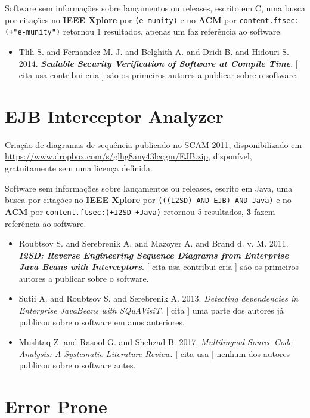 Software sem informações sobre lançamentos ou releases,
escrito em C,
uma busca por citações no {\bf IEEE Xplore} por
\texttt{(e-munity)}
e no {\bf ACM} por
\texttt{content.ftsec:(+"e-munity")}
retornou
1 resultados,
apenas um faz referência ao software.

\begin{itemize}
\item Tlili S. and Fernandez M. J. and Belghith A. and Dridi B. and Hidouri S.
      2014.
        \textbf{\textit{ Scalable Security Verification of Software at Compile Time}}.
      [
          cita
          usa
          contribui
          cria
      ]
são os primeiros autores a publicar sobre o software.
\end{itemize}
\section{EJB Interceptor Analyzer}

Criação de diagramas de sequência
publicado no SCAM 2011,
disponibilizado em \url{https://www.dropbox.com/s/glhg8any43lccgm/EJB.zip},
disponível,
gratuitamente
sem uma licença definida.

Software sem informações sobre lançamentos ou releases,
escrito em Java,
uma busca por citações no {\bf IEEE Xplore} por
\texttt{(((I2SD) AND EJB) AND Java)}
e no {\bf ACM} por
\texttt{content.ftsec:(+I2SD +Java)}
retornou
5 resultados,
{\bf 3} fazem referência ao software.

\begin{itemize}
\item Roubtsov S. and Serebrenik A. and Mazoyer A. and Brand d. v. M.
      2011.
        \textbf{\textit{ I2SD: Reverse Engineering Sequence Diagrams from Enterprise Java Beans with Interceptors}}.
      [
          cita
          usa
          contribui
          cria
      ]
são os primeiros autores a publicar sobre o software.
\item Sutii A. and Roubtsov S. and Serebrenik A.
      2013.
        \textit{ Detecting dependencies in Enterprise JavaBeans with SQuAVisiT}.
      [
          cita
      ]
uma parte dos autores já publicou sobre o software em anos anteriores.
\item Mushtaq Z. and Rasool G. and Shehzad B.
      2017.
        \textit{ Multilingual Source Code Analysis: A Systematic Literature Review}.
      [
          cita
          usa
      ]
nenhum dos autores publicou sobre o software antes.
\end{itemize}
\section{Error Prone}

